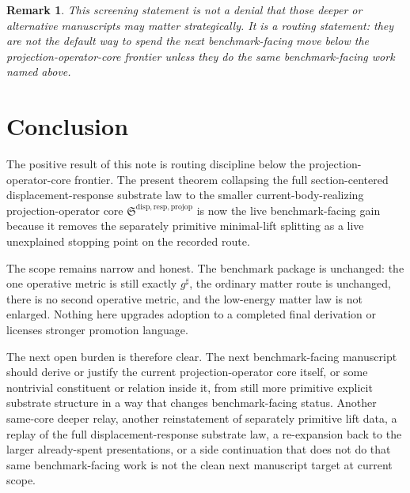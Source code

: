 \documentclass[11pt]{article}
\newcommand{\CompletedMetric}{g^{\sharp}}
\newcommand{\ProjectionOperatorCore}{\mathfrak S^{\mathrm{disp,resp,projop}}}
\newtheorem{remark}{Remark}
\begin{document}
\begin{remark}
This screening statement is not a denial that those deeper or alternative manuscripts may matter strategically. It is a routing statement: they are not the default way to spend the next benchmark-facing move below the projection-operator-core frontier unless they do the same benchmark-facing work named above.
\end{remark}

\section{Conclusion}

The positive result of this note is routing discipline below the projection-operator-core frontier. The present theorem collapsing the full section-centered displacement-response substrate law to the smaller current-body-realizing projection-operator core \(\ProjectionOperatorCore\) is now the live benchmark-facing gain because it removes the separately primitive minimal-lift splitting as a live unexplained stopping point on the recorded route.

The scope remains narrow and honest. The benchmark package is unchanged: the one operative metric is still exactly \(\CompletedMetric\), the ordinary matter route is unchanged, there is no second operative metric, and the low-energy matter law is not enlarged. Nothing here upgrades adoption to a completed final derivation or licenses stronger promotion language.

The next open burden is therefore clear. The next benchmark-facing manuscript should derive or justify the current projection-operator core itself, or some nontrivial constituent or relation inside it, from still more primitive explicit substrate structure in a way that changes benchmark-facing status. Another same-core deeper relay, another reinstatement of separately primitive lift data, a replay of the full displacement-response substrate law, a re-expansion back to the larger already-spent presentations, or a side continuation that does not do that same benchmark-facing work is not the clean next manuscript target at current scope.
\end{document}
